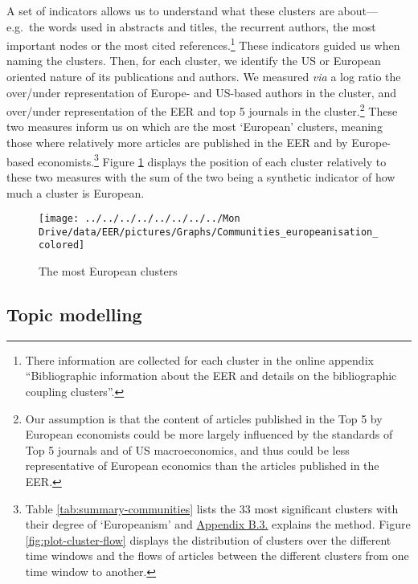 \documentclass[
  12pt,
  onecolumn]{article}
\begin{document}
A set of indicators allows us to understand what these clusters are
about---e.g.~the words used in abstracts and titles, the recurrent
authors, the most important nodes or the most cited
references.\footnote{There information are collected for each cluster in
  the online appendix ``Bibliographic information about the EER and
  details on the bibliographic coupling clusters''.} These indicators
guided us when naming the clusters. Then, for each cluster, we identify
the US or European oriented nature of its publications and authors. We
measured \emph{via} a log ratio the over/under representation of Europe-
and US-based authors in the cluster, and over/under representation of
the EER and top 5 journals in the cluster.\footnote{Our assumption is
  that the content of articles published in the Top 5 by European
  economists could be more largely influenced by the standards of Top 5
  journals and of US macroeconomics, and thus could be less
  representative of European economics than the articles published in
  the EER.} These two measures inform us on which are the most
`European' clusters, meaning those where relatively more articles are
published in the EER and by Europe-based economists.\footnote{Table
  \ref{tab:summary-communities} lists the 33 most significant clusters
  with their degree of `Europeanism' and
  \protect\hyperlink{network}{Appendix B.3.} explains the method. Figure
  \ref{fig:plot-cluster-flow} displays the distribution of clusters over
  the different time windows and the flows of articles between the
  different clusters from one time window to another.} Figure
\ref{fig:plot-community-diff} displays the position of each cluster
relatively to these two measures with the sum of the two being a
synthetic indicator of how much a cluster is European.

\begin{figure}[h]

{\centering \texttt{[image: ../../../../../../../../Mon Drive/data/EER/pictures/Graphs/Communities\_europeanisation\_colored]} 

}

\caption{The most European clusters}\label{fig:plot-community-diff}
\end{figure}

\hypertarget{topic-modelling}{%
\subsection{Topic modelling}\label{topic-modelling}}
\end{document}
